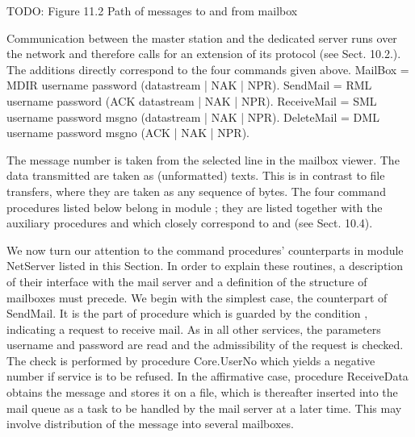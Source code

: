 TODO: Figure 11.2 Path of messages to and from mailbox

Communication between the master station and the dedicated server runs over the network and therefore calls for an extension of its protocol (see Sect. 10.2.). The additions directly correspond to the four commands given above.
\begintt
MailBox = MDIR username password (datastream | NAK | NPR).
SendMail = RML username password (ACK datastream | NAK | NPR).
ReceiveMail = SML username password msgno (datastream | NAK | NPR).
DeleteMail = DML username password msgno (ACK | NAK | NPR).
\endtt

\noindent  The message number is taken from the selected line in the mailbox viewer. The data transmitted are taken as (unformatted) texts. This is in contrast to file transfers, where they are taken as any sequence of bytes. The four command procedures listed below belong in module ; they are listed together with the auxiliary procedures  and  which closely correspond to  and  (see Sect. 10.4).

We now turn our attention to the command procedures' counterparts in module NetServer listed in this Section. In order to explain these routines, a description of their interface with the mail server and a definition of the structure of mailboxes must precede. We begin with the simplest case, the counterpart of SendMail. It is the part of procedure  which is guarded by the condition , indicating a request to receive mail. As in all other services, the parameters username and password are read and the admissibility of the request is checked. The check is performed by procedure Core.UserNo which yields a negative number if service is to be refused. In the affirmative case, procedure ReceiveData obtains the message and stores it on a file, which is thereafter inserted into the mail queue as a task to be handled by the mail server at a later time. This may involve distribution of the message into several mailboxes.

